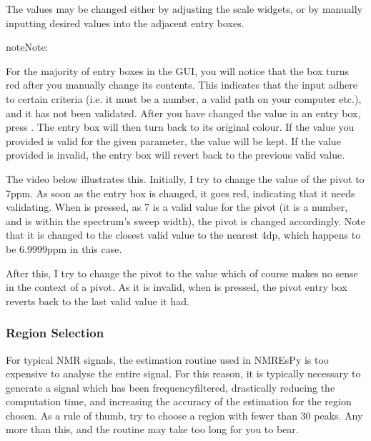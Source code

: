 \documentclass[letterpaper,10pt,english]{sphinxmanual}
\begin{document}
\sphinxAtStartPar
The values may be changed either by adjusting the scale widgets, or by manually
inputting desired values into the adjacent entry boxes.

\begin{sphinxadmonition}{note}{Note:}
\sphinxAtStartPar
{}

\sphinxAtStartPar
For the majority of entry boxes in the GUI, you will notice that the box
turns red after you manually change its contents. This indicates
that the input adhere to certain criteria (i.e. it must be a number, a
valid path on your computer etc.), and it has not been validated. After you
have changed the value in an entry box, press . The entry box
will then turn back to its original colour. If the value you
provided is valid for the given parameter, the value will be kept. If the
value provided is invalid, the entry box will revert back to the previous
valid value.

\sphinxAtStartPar
The video below illustrates this. Initially, I try to change the value
of the pivot to 7ppm. As soon as the entry box is changed, it goes red,
indicating that it needs validating. When  is pressed, as 7 is
a valid value for the pivot (it is a number, and is within the spectrum’s
sweep width), the pivot is changed accordingly. Note that it is changed to
the closest valid value to the nearest 4dp, which happens to be 6.9999ppm
in this case.

\sphinxAtStartPar
After this, I try to change the pivot to the value  which of
course makes no sense in the context of a pivot. As it is invalid, when
 is pressed, the pivot entry box reverts back to the last valid
value it had.


\end{sphinxadmonition}


\subsubsection{Region Selection}
\label{\detokenize{gui/usage/setup:region-selection}}
\sphinxAtStartPar
For typical NMR signals, the estimation routine used in NMR\sphinxhyphen{}EsPy is
too expensive to analyse the entire signal. For this reason, it is typically
necessary to generate a signal which has been frequency\sphinxhyphen{}filtered, drastically
reducing the computation time, and increasing the accuracy of the estimation
for the region chosen. As a rule of thumb, try to choose a region with fewer
than 30 peaks. Any more than this, and the routine may take too long for you
to bear.
\end{document}
